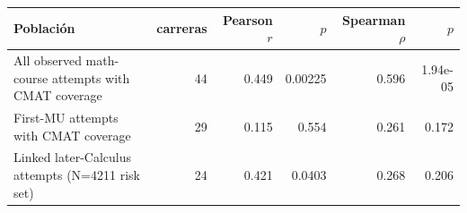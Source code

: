 \begin{tabular}{p{6.4cm}rrrrr}
\toprule
Población & carreras & Pearson $r$ & $p$ & Spearman $\rho$ & $p$ \\
\midrule
All observed math-course attempts with CMAT coverage & 44 & 0.449 & 0.00225 & 0.596 & 1.94e-05 \\
First-MU attempts with CMAT coverage & 29 & 0.115 & 0.554 & 0.261 & 0.172 \\
Linked later-Calculus attempts (N=4211 risk set) & 24 & 0.421 & 0.0403 & 0.268 & 0.206 \\
\bottomrule
\end{tabular}
